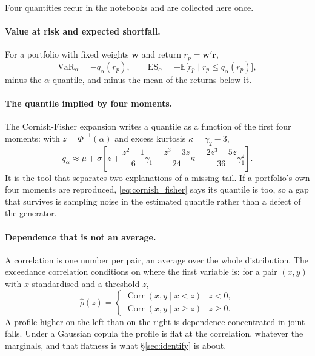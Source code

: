 \documentclass[11pt]{article}
\DeclareMathOperator{\Corr}{Corr}
\begin{document}
Four quantities recur in the notebooks and are collected here once.

\paragraph{Value at risk and expected shortfall.} For a portfolio with fixed
weights $\mathbf w$ and return $r_p = \mathbf w' \mathbf r$,
\begin{equation}\label{eq:var_es}
  \mathrm{VaR}_\alpha = -q_\alpha(r_p), \qquad
  \mathrm{ES}_\alpha = -\mathbb E\big[r_p \mid r_p \le q_\alpha(r_p)\big],
\end{equation}
minus the $\alpha$ quantile, and minus the mean of the returns below it.

\paragraph{The quantile implied by four moments.} The Cornish-Fisher expansion
writes a quantile as a function of the first four moments: with
$z = \Phi^{-1}(\alpha)$ and excess kurtosis $\kappa = \gamma_2 - 3$,
\begin{equation}\label{eq:cornish_fisher}
  q_\alpha \approx \mu + \sigma \left[ z + \frac{z^2 - 1}{6}\gamma_1
   + \frac{z^3 - 3z}{24}\kappa - \frac{2z^3 - 5z}{36}\gamma_1^2 \right].
\end{equation}
It is the tool that separates two explanations of a missing tail. If a
portfolio's own four moments are reproduced, \eqref{eq:cornish_fisher} says
its quantile is too, so a gap that survives is sampling noise in the
estimated quantile rather than a defect of the generator.

\paragraph{Dependence that is not an average.} A correlation is one number per
pair, an average over the whole distribution. The exceedance correlation
conditions on where the first variable is: for a pair $(x, y)$ with $x$
standardised and a threshold $z$,
\begin{equation}\label{eq:exceedance}
  \hat\rho(z) = \begin{cases}
    \Corr(x, y \mid x < z) & z < 0, \\
    \Corr(x, y \mid x \ge z) & z \ge 0 .
  \end{cases}
\end{equation}
A profile higher on the left than on the right is dependence concentrated in
joint falls. Under a Gaussian copula the profile is flat at the correlation,
whatever the marginals, and that flatness is what \S\ref{sec:identify} is
about.
\end{document}
